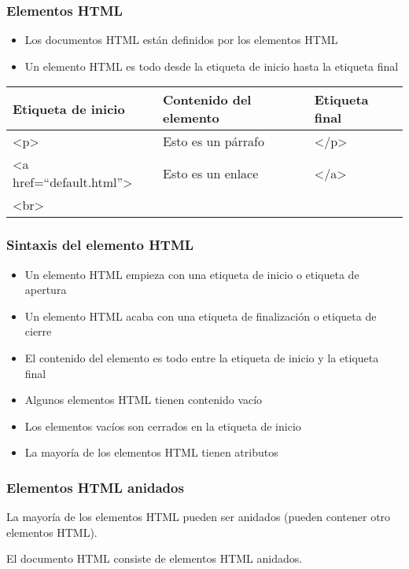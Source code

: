 \documentclass[12pt,a4paper]{beamer}
\begin{document}
\begin{frame}
	\frametitle{Elementos HTML}
	
	\begin{itemize}
		\item Los documentos HTML están definidos por los elementos HTML \pause
		\item Un elemento HTML es todo desde la etiqueta de inicio hasta la etiqueta final		
	\end{itemize}
	
	\begin{center}
		\begin{tabular}{|p{4cm}|p{3.5cm}|p{2.5cm}|}
			\hline
			Etiqueta de inicio	&	Contenido del elemento	&	Etiqueta final\\
			\hline
			<p>	&	Esto es un párrafo	&	</p>\\
			<a href=``default.html''>	&	Esto es un enlace	&	</a>\\
			<br>	&	&\\
			\hline		
		\end{tabular}
	\end{center}	
\end{frame}

\begin{frame}
	\frametitle{Sintaxis del elemento HTML}
	
	\begin{itemize}
		\item Un elemento HTML empieza con una etiqueta de inicio o etiqueta de apertura \pause
		\item Un elemento HTML acaba con una etiqueta de finalización o etiqueta de cierre \pause
		\item El contenido del elemento es todo entre la etiqueta de inicio y la etiqueta final \pause
		\item Algunos elementos HTML tienen contenido vacío \pause
		\item Los elementos vacíos son cerrados en la etiqueta de inicio \pause
		\item La mayoría de los elementos HTML tienen atributos
	\end{itemize}
\end{frame}

\begin{frame}
	\frametitle{Elementos HTML anidados}
	
	La mayoría de los elementos HTML pueden ser anidados (pueden contener otro elementos HTML).
	
	El documento HTML consiste de elementos HTML anidados.
\end{frame}
\end{document}
